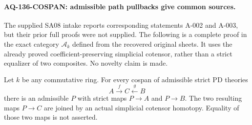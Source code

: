 \paragraph{AQ-136-COSPAN: admissible path pullbacks give common sources.}
The supplied SA08 intake reports corresponding statements
A-002 and A-003, but their prior full proofs were not supplied.
The following is a complete proof in the exact category
$\mathcal A_k$ defined from the recovered original sheets.
It uses the already proved coefficient-preserving simplicial
cotensor, rather than a strict equalizer of two composites.
No novelty claim is made.

Let $k$ be any commutative ring. For every cospan of admissible
strict PD theories
\[
                         A\xrightarrow{f}C
                                      \xleftarrow{g}B
                                                               \tag{136.CS1}
\]
there is an admissible $P$ with strict maps $P\to A$ and
$P\to B$. The two resulting maps $P\to C$ are joined by
an actual simplicial cotensor homotopy. Equality of those
two maps is not asserted.

